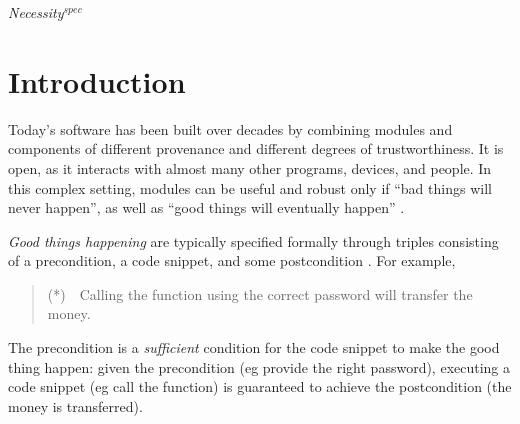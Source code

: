 \newcommand{\sophiaPonder}[2][]{\ponders{Sophia}{blue}{#1} \textcolor{blue}{#2}\xspace}
\renewcommand{\sophia}[2][]


\renewcommand{\Chainmail}{\textit{Necessity}$^{spec}$\xspace}  
\newcommand{\Chainspec}{\textit{Necessity}$^{spec}$\xspace}
\newcommand{\Chainlogic}{\textit{Necessity}$^{logic}$\xspace}
\newcommand{\NecessitySpecifications}{Necessity Specifications\xspace}
\newcommand{\NecessitySpecification}{Necessity Specification\xspace}
\section{Introduction}

Today's   software has been built 
over decades by combining modules and components of
different provenance and different degrees of trustworthiness. It 
is open, as it interacts with almost many other programs, devices, and people.
In this complex setting, modules can  be useful and robust only if
``bad things will never happen'', %
as well as ``good things
will eventually happen'' %
\cite{Lamport77}. 
 
  \vspace{.03in}
\emph{Good things happening} are typically specified formally 
 through triples consisting of a  precondition, a code snippet, and some
 postcondition \cite{Hoare69}.
 For example,
 \begin{quote}
(*)\  \ Calling the  function  using the correct 
 password will transfer the money.
\end{quote}
  The precondition is a \emph{sufficient} condition for the code snippet to
make the good thing happen: given the precondition (eg provide the right 
password), executing a
code snippet (eg call  the  function) 
is guaranteed to achieve the postcondition (the money is transferred).

